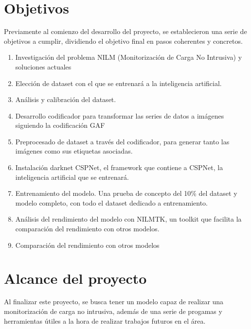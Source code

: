\section{Objetivos}
\label{sec:objetivos}
Previamente al comienzo del desarrollo del proyecto, se establecieron una serie de objetivos a cumplir, dividiendo el objetivo final en pasos coherentes y concretos.
\begin{enumerate}
	\item Investigación del problema NILM (Monitorización de Carga No Intrusiva) y soluciones actuales
	\item Elección de dataset con el que se entrenará a la inteligencia artificial.
	\item Análisis y calibración del dataset.
	\item Desarrollo codificador para transformar las series de datos a imágenes siguiendo la codificación GAF
	\item Preprocesado de dataset a través del codificador, para generar tanto las imágenes como sus etiquetas asociadas. 
	\item Instalación darknet CSPNet, el framework que contiene a CSPNet, la inteligencia artificial que se entrenará.
	\item Entrenamiento del modelo. Una prueba de concepto del 10\% del dataset y modelo completo, con todo el dataset dedicado a entrenamiento.
	\item Análisis del rendimiento del modelo con NILMTK, un toolkit que facilita la comparación del rendimiento con otros modelos. 
	\item Comparación del rendimiento con otros modelos
\end{enumerate}

\section{Alcance del proyecto}
\label{sec:alcanceproyecto}
Al finalizar este proyecto, se busca tener un modelo capaz de realizar una monitorización de carga no intrusiva, además de una serie de progamas y herramientas útiles a la hora de realizar trabajos futuros en el área.

